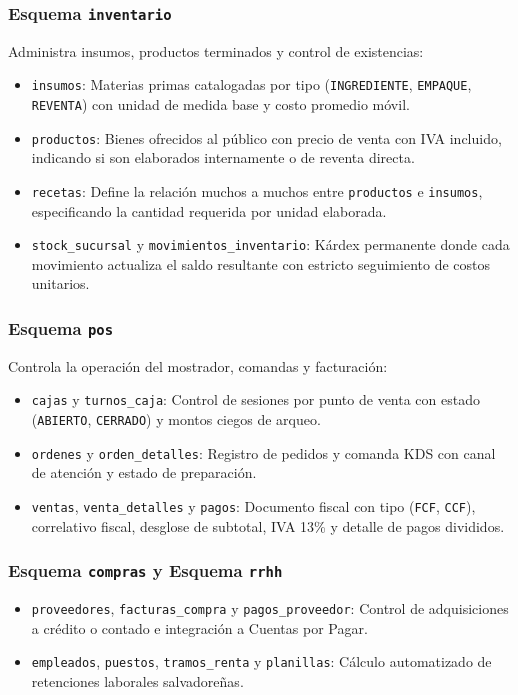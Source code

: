 \subsubsection{Esquema \texttt{inventario}}
Administra insumos, productos terminados y control de existencias:
\begin{itemize}
    \item \texttt{insumos}: Materias primas catalogadas por tipo (\texttt{INGREDIENTE}, \texttt{EMPAQUE}, \texttt{REVENTA}) con unidad de medida base y costo promedio móvil.
    \item \texttt{productos}: Bienes ofrecidos al público con precio de venta con IVA incluido, indicando si son elaborados internamente o de reventa directa.
    \item \texttt{recetas}: Define la relación muchos a muchos entre \texttt{productos} e \texttt{insumos}, especificando la cantidad requerida por unidad elaborada.
    \item \texttt{stock\_sucursal} y \texttt{movimientos\_inventario}: Kárdex permanente donde cada movimiento actualiza el saldo resultante con estricto seguimiento de costos unitarios.
\end{itemize}

\subsubsection{Esquema \texttt{pos}}
Controla la operación del mostrador, comandas y facturación:
\begin{itemize}
    \item \texttt{cajas} y \texttt{turnos\_caja}: Control de sesiones por punto de venta con estado (\texttt{ABIERTO}, \texttt{CERRADO}) y montos ciegos de arqueo.
    \item \texttt{ordenes} y \texttt{orden\_detalles}: Registro de pedidos y comanda KDS con canal de atención y estado de preparación.
    \item \texttt{ventas}, \texttt{venta\_detalles} y \texttt{pagos}: Documento fiscal con tipo (\texttt{FCF}, \texttt{CCF}), correlativo fiscal, desglose de subtotal, IVA 13\% y detalle de pagos divididos.
\end{itemize}

\subsubsection{Esquema \texttt{compras} y Esquema \texttt{rrhh}}
\begin{itemize}
    \item \texttt{proveedores}, \texttt{facturas\_compra} y \texttt{pagos\_proveedor}: Control de adquisiciones a crédito o contado e integración a Cuentas por Pagar.
    \item \texttt{empleados}, \texttt{puestos}, \texttt{tramos\_renta} y \texttt{planillas}: Cálculo automatizado de retenciones laborales salvadoreñas.
\end{itemize}

